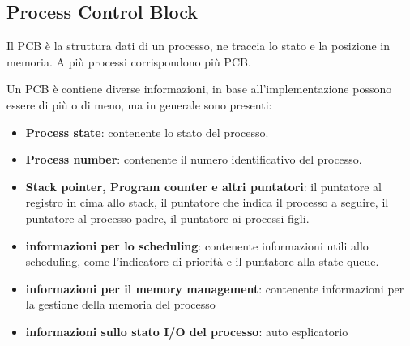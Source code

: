 \documentclass{article}
\begin{document}
    \subsection{Process Control Block}
        \begin{tcolorbox}[colback= green!10!white, colframe= green!40!black, title=Program Control Block]
            Il PCB è la struttura dati di un processo, ne traccia lo stato e la posizione in memoria.
            A più processi corrispondono più PCB.
        \end{tcolorbox}
        Un PCB è contiene diverse informazioni, in base all'implementazione possono essere di più o di meno, ma in generale sono presenti:
        \begin{itemize}
            \item \textbf{Process state}:
                contenente lo stato del processo.
            \item \textbf{Process number}:
                contenente il numero identificativo del processo.
            \item \textbf{Stack pointer, Program counter e altri puntatori}:
                il puntatore al registro in cima allo stack, il puntatore che indica il processo a seguire, il puntatore al processo padre, il puntatore ai processi figli.
            \item \textbf{informazioni per lo scheduling}:
                contenente informazioni utili allo scheduling, come l'indicatore di priorità e il puntatore alla state queue.
            \item \textbf{informazioni per il memory management}:
                contenente informazioni per la gestione della memoria del processo
            \item \textbf{informazioni sullo stato I/O del processo}:
                auto esplicatorio
        \end{itemize}
\end{document}
